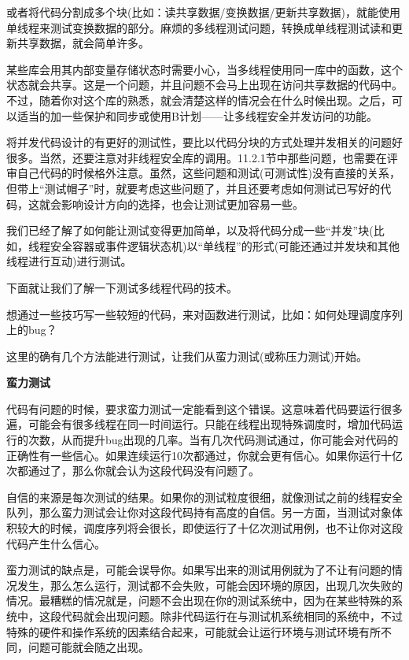 或者将代码分割成多个块(比如：读共享数据/变换数据/更新共享数据)，就能使用单线程来测试变换数据的部分。麻烦的多线程测试问题，转换成单线程测试读和更新共享数据，就会简单许多。

某些库会用其内部变量存储状态时需要小心，当多线程使用同一库中的函数，这个状态就会共享。这是一个问题，并且问题不会马上出现在访问共享数据的代码中。不过，随着你对这个库的熟悉，就会清楚这样的情况会在什么时候出现。之后，可以适当的加一些保护和同步或使用B计划——让多线程安全并发访问的功能。

将并发代码设计的有更好的测试性，要比以代码分块的方式处理并发相关的问题好很多。当然，还要注意对非线程安全库的调用。11.2.1节中那些问题，也需要在评审自己代码的时候格外注意。虽然，这些问题和测试(可测试性)没有直接的关系，但带上“测试帽子”时，就要考虑这些问题了，并且还要考虑如何测试已写好的代码，这就会影响设计方向的选择，也会让测试更加容易一些。

我们已经了解了如何能让测试变得更加简单，以及将代码分成一些“并发”块(比如，线程安全容器或事件逻辑状态机)以“单线程”的形式(可能还通过并发块和其他线程进行互动)进行测试。

下面就让我们了解一下测试多线程代码的技术。


想通过一些技巧写一些较短的代码，来对函数进行测试，比如：如何处理调度序列上的bug？

这里的确有几个方法能进行测试，让我们从蛮力测试(或称压力测试)开始。

\textbf{蛮力测试}

代码有问题的时候，要求蛮力测试一定能看到这个错误。这意味着代码要运行很多遍，可能会有很多线程在同一时间运行。只能在线程出现特殊调度时，增加代码运行的次数，从而提升bug出现的几率。当有几次代码测试通过，你可能会对代码的正确性有一些信心。如果连续运行10次都通过，你就会更有信心。如果你运行十亿次都通过了，那么你就会认为这段代码没有问题了。

自信的来源是每次测试的结果。如果你的测试粒度很细，就像测试之前的线程安全队列，那么蛮力测试会让你对这段代码持有高度的自信。另一方面，当测试对象体积较大的时候，调度序列将会很长，即使运行了十亿次测试用例，也不让你对这段代码产生什么信心。

蛮力测试的缺点是，可能会误导你。如果写出来的测试用例就为了不让有问题的情况发生，那么怎么运行，测试都不会失败，可能会因环境的原因，出现几次失败的情况。最糟糕的情况就是，问题不会出现在你的测试系统中，因为在某些特殊的系统中，这段代码就会出现问题。除非代码运行在与测试机系统相同的系统中，不过特殊的硬件和操作系统的因素结合起来，可能就会让运行环境与测试环境有所不同，问题可能就会随之出现。


